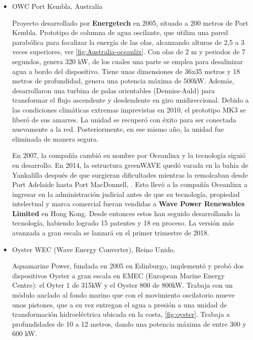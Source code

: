 \begin{itemize}
\item
  OWC Port Kembla, Australia

  Proyecto desarrollado por \textbf{Energetech} en 2005, situado a 200
  metros de Port Kembla. Prototipo de columna de agua oscilante, que
  utiliza una pared parabólica para focalizar la energía de las olas,
  alcanzando alturas de 2,5 a 3 veces superiores, ver \autoref{fig:Australia-oceanlix}. Con olas de 2 m y
  periodos de 7 segundos, genera 320 kW, de los cuales una parte se
  emplea para desalinizar agua a bordo del dispositivo. Tiene unas
  dimensiones de 36x35 metros y 18 metros de profundidad, genera una
  potencia máxima de 500kW. Además, desarrollaron una turbina de palas
  orientables (Denniss-Auld) para transformar el flujo ascendente y
  desdendente en giro unidireccional. Debido a las condiciones
  climáticas extremas imprevistas en 2010, el prototipo MK3 se liberó de
  sus amarres. La unidad se recuperó con éxito para ser conectada
  nuevamente a la red. Posteriormente, en ese mismo año, la unidad fue
  eliminada de manera
  segura.



  En 2007, la compañía cambió su nombre por Oceanlinx \cite{oceanlinx17} y la tecnología
  siguió en desarrollo. En 2014, la estructura greenWAVE quedó varada en
  la bahia de Yankalilla después de que surgieran dificultades mientras
  la remolcaban desde Port Adelaide hasta Port MacDonnell, \cite{greenwave15}. Esto llevó a la compañía Oceanlinx a ingresar en la
  administración judicial antes de que su tecnología, propiedad
  intelectual y marca comercial fueran vendidas a \textbf{Wave Power
  Renewables Limited} en Hong Kong. Desde entonces estos han seguido
  desarrollando la tecnología, habiendo logrado 15 patentes y 18 en
  proceso. La versión más avanzada a gran escala se lanzará en el primer
  trimestre de 2018.
\item
  Oyster WEC (Wave Energy Converter), Reino Unido.

  Aquamarine Power, fundada en 2005 en Edinburgo, implementó y probó dos
  dispositivos Oyster a gran escala en EMEC (European Marine Energy
  Centre): el Oyter 1 de 315kW y el Oyster 800 de 800kW. Trabaja con un
  módulo anclado al fondo marino que con el movimiento oscilatorio mueve
  unos pistones, que a su vez entregan el agua a presión a una unidad de
  transformación hidroeléctrica ubicada en la costa, \autoref{fig:oyster}. Trabaja a
  profundidades de 10 a 12 metros, dando una potencia máxima de entre
  300 y 600 kW.


\end{itemize}
